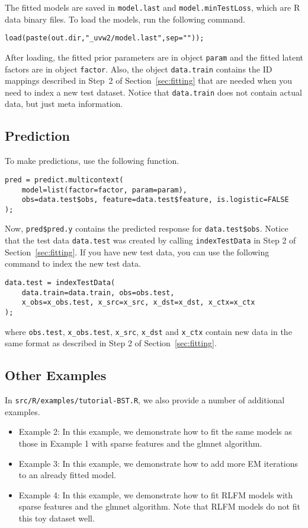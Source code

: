 \documentclass[10pt]{article}
\newcommand{\parahead}[1]{\vspace{0.15in}\noindent{\bf #1:}}
\begin{document}
\parahead{Model File}
The fitted models are saved in {\tt model.last} and {\tt model.minTestLoss}, which are R data binary files.  To load the models, run the following command.
{\small\begin{verbatim}
load(paste(out.dir,"_uvw2/model.last",sep=""));
\end{verbatim}}
\noindent After loading, the fitted prior parameters are in object {\tt param} and the fitted latent factors are in object {\tt factor}.  Also, the object {\tt data.train} contains the ID mappings described in Step~2 of Section~\ref{sec:fitting} that are needed when you need to index a new test dataset.  Notice that {\tt data.train} does not contain actual data, but just meta information.

\subsection{Prediction}

To make predictions, use the following function.
{\small\begin{verbatim}
pred = predict.multicontext(
    model=list(factor=factor, param=param), 
    obs=data.test$obs, feature=data.test$feature, is.logistic=FALSE
);
\end{verbatim}}
\noindent Now, {\tt pred\$pred.y} contains the predicted response for {\tt data.test\$obs}.  Notice that the test data {\tt data.test} was created by calling {\tt indexTestData} in Step 2 of Section~\ref{sec:fitting}.  If you have new test data, you can use the following command to index the new test data.
{\small\begin{verbatim}
data.test = indexTestData(
    data.train=data.train, obs=obs.test,
    x_obs=x_obs.test, x_src=x_src, x_dst=x_dst, x_ctx=x_ctx
);
\end{verbatim}}
\noindent where {\tt obs.test}, {\tt x\_obs.test}, {\tt x\_src}, {\tt x\_dst} and {\tt x\_ctx} contain new data in the same format as described in Step 2 of Section~\ref{sec:fitting}.

\subsection{Other Examples}

In {\tt src/R/examples/tutorial-BST.R}, we also provide a number of additional examples.
\begin{itemize}
\item Example 2: In this example, we demonstrate how to fit the same models as those in Example 1 with sparse features and the glmnet algorithm.
\item Example 3: In this example, we demonstrate how to add more EM iterations to an already fitted model.
\item Example 4: In this example, we demonstrate how to fit RLFM models with sparse features and the glmnet algorithm.  Note that RLFM models do not fit this toy dataset well.
\end{itemize}




\end{document}
